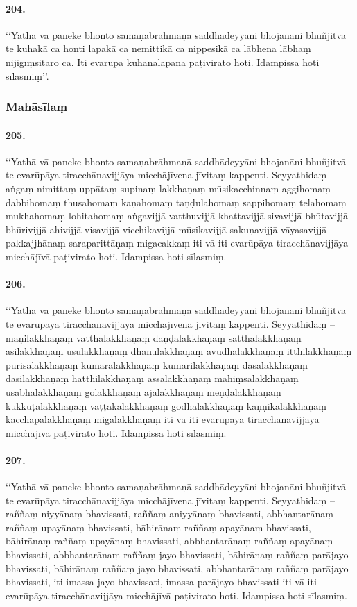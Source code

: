 \paragraph{204.} ‘‘Yathā vā paneke bhonto samaṇabrāhmaṇā saddhādeyyāni bhojanāni bhuñjitvā te kuhakā ca honti lapakā ca nemittikā ca nippesikā ca lābhena lābhaṃ nijigīṃsitāro ca. Iti evarūpā kuhanalapanā paṭivirato hoti. Idampissa hoti sīlasmiṃ’’.


\subsubsection{Mahāsīlaṃ}

\paragraph{205.} ‘‘Yathā vā paneke bhonto samaṇabrāhmaṇā saddhādeyyāni bhojanāni bhuñjitvā te evarūpāya tiracchānavijjāya micchājīvena jīvitaṃ kappenti. Seyyathidaṃ – aṅgaṃ nimittaṃ uppātaṃ supinaṃ lakkhaṇaṃ mūsikacchinnaṃ aggihomaṃ dabbihomaṃ thusahomaṃ kaṇahomaṃ taṇḍulahomaṃ sappihomaṃ telahomaṃ mukhahomaṃ lohitahomaṃ aṅgavijjā vatthuvijjā khattavijjā sivavijjā bhūtavijjā bhūrivijjā ahivijjā visavijjā vicchikavijjā mūsikavijjā sakuṇavijjā vāyasavijjā pakkajjhānaṃ saraparittāṇaṃ migacakkaṃ iti vā iti evarūpāya tiracchānavijjāya micchājīvā paṭivirato hoti. Idampissa hoti sīlasmiṃ.

\paragraph{206.} ‘‘Yathā vā paneke bhonto samaṇabrāhmaṇā saddhādeyyāni bhojanāni bhuñjitvā te evarūpāya tiracchānavijjāya micchājīvena jīvitaṃ kappenti. Seyyathidaṃ – maṇilakkhaṇaṃ vatthalakkhaṇaṃ daṇḍalakkhaṇaṃ satthalakkhaṇaṃ asilakkhaṇaṃ usulakkhaṇaṃ dhanulakkhaṇaṃ āvudhalakkhaṇaṃ itthilakkhaṇaṃ purisalakkhaṇaṃ kumāralakkhaṇaṃ kumārilakkhaṇaṃ dāsalakkhaṇaṃ dāsilakkhaṇaṃ hatthilakkhaṇaṃ assalakkhaṇaṃ mahiṃsalakkhaṇaṃ usabhalakkhaṇaṃ golakkhaṇaṃ ajalakkhaṇaṃ meṇḍalakkhaṇaṃ kukkuṭalakkhaṇaṃ vaṭṭakalakkhaṇaṃ godhālakkhaṇaṃ kaṇṇikalakkhaṇaṃ kacchapalakkhaṇaṃ migalakkhaṇaṃ iti vā iti evarūpāya tiracchānavijjāya micchājīvā paṭivirato hoti. Idampissa hoti sīlasmiṃ.

\paragraph{207.} ‘‘Yathā vā paneke bhonto samaṇabrāhmaṇā saddhādeyyāni bhojanāni bhuñjitvā te evarūpāya tiracchānavijjāya micchājīvena jīvitaṃ kappenti. Seyyathidaṃ – raññaṃ niyyānaṃ bhavissati, raññaṃ aniyyānaṃ bhavissati, abbhantarānaṃ raññaṃ upayānaṃ bhavissati, bāhirānaṃ raññaṃ apayānaṃ bhavissati, bāhirānaṃ raññaṃ upayānaṃ bhavissati, abbhantarānaṃ raññaṃ apayānaṃ bhavissati, abbhantarānaṃ raññaṃ jayo bhavissati, bāhirānaṃ raññaṃ parājayo bhavissati, bāhirānaṃ raññaṃ jayo bhavissati, abbhantarānaṃ raññaṃ parājayo bhavissati, iti imassa jayo bhavissati, imassa parājayo bhavissati iti vā iti evarūpāya tiracchānavijjāya micchājīvā paṭivirato hoti. Idampissa hoti sīlasmiṃ.

